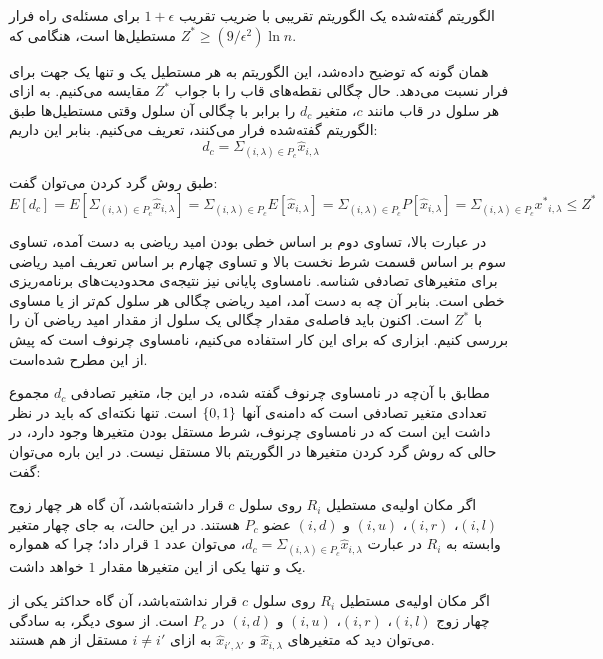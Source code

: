 

الگوریتم گفته‌شده یک الگوریتم تقریبی با ضریب تقریب $1+\epsilon$ برای مسئله‌ی راه فرار مستطیل‌ها است، هنگامی که $Z^{*} \geq (9/\epsilon^{2}) \ln n$.



همان گونه که توضیح داده‌شد، این الگوریتم به هر مستطیل یک و تنها یک جهت برای فرار نسبت می‌دهد. حال چگالی نقطه‌های قاب را با جواب $Z^{*}$ مقایسه می‌کنیم. به ازای هر سلول در قاب مانند $c$، متغیر $d_c$ را برابر با چگالی آن سلول وقتی مستطیل‌ها طبق الگوریتم گفته‌شده فرار می‌کنند، تعریف می‌کنیم. بنابر این داریم:
$$d_c = \Sigma_{(i, \lambda) \in P_c} {{\hat{x}}_{i, \lambda}}$$

طبق روش گرد کردن می‌توان گفت:
$$E[d_c] = E[\Sigma_{(i, \lambda) \in P_c} {\hat{x}}_{i, \lambda}] =  \Sigma_{(i, \lambda) \in P_c} E[{\hat{x}}_{i, \lambda}] =  \Sigma_{(i, \lambda) \in P_c} P[{\hat{x}}_{i, \lambda}] =  \Sigma_{(i, \lambda) \in P_c} {x^{*}}_{i, \lambda} \leq Z^{*}$$

در عبارت بالا، تساوی دوم بر اساس خطی بودن امید ریاضی به دست آمده، تساوی سوم بر اساس قسمت شرط نخست بالا و تساوی چهارم بر اساس تعریف امید ریاضی برای متغیر‌های تصادفی شناسه. نامساوی پایانی نیز نتیجه‌ی محدودیت‌های برنامه‌ریزی خطی است.  بنابر آن چه به دست آمد، امید ریاضی چگالی هر سلول کم‌تر از یا مساوی با  $Z^{*}$  است. اکنون باید فاصله‌ی مقدار چگالی یک سلول از مقدار امید ریاضی آن را بررسی کنیم. ابزاری که برای این کار استفاده می‌کنیم، نامساوی چرنوف است که پیش از این مطرح شده‌است.

مطابق با آن‌چه در نامساوی چرنوف گفته شده، در این جا، متغیر تصادفی $d_c$ مجموع تعدادی متغیر تصادفی است که دامنه‌ی آنها ${\{ 0, 1 \}}$ است. تنها نکته‌ای که باید در نظر داشت این است که در نامساوی چرنوف، شرط مستقل بودن متغیرها وجود دارد، در حالی که روش گرد کردن متغیرها در الگوریتم بالا مستقل نیست. در این باره می‌توان گفت:


 اگر مکان اولیه‌ی مستطیل $R_{i}$ روی سلول $c$ قرار داشته‌باشد، آن گاه هر چهار زوج $(i, l)$، $(i, r)$، $(i, u)$ و $(i, d)$ عضو $P_c$ هستند. در این حالت، به جای چهار متغیر وابسته به $R_{i}$ در عبارت $d_c = \Sigma_{(i, \lambda) \in P_c} {{\hat{x}}_{i, \lambda}}$، می‌توان عدد $1$ قرار داد؛ چرا که همواره یک و تنها یکی از این متغیر‌ها مقدار $1$ خواهد داشت.

 اگر مکان اولیه‌ی مستطیل $R_{i}$ روی سلول $c$ قرار نداشته‌باشد، آن گاه حد‌اکثر یکی از چهار زوج $(i, l)$، $(i, r)$، $(i, u)$ و $(i, d)$  در $P_c$ است. از سوی دیگر، به سادگی می‌توان دید که متغیر‌های ${\hat{x}}_{i, \lambda}$ و ${\hat{x}}_{i', \lambda'}$ به ازای $i \neq i'$ مستقل از هم هستند.

